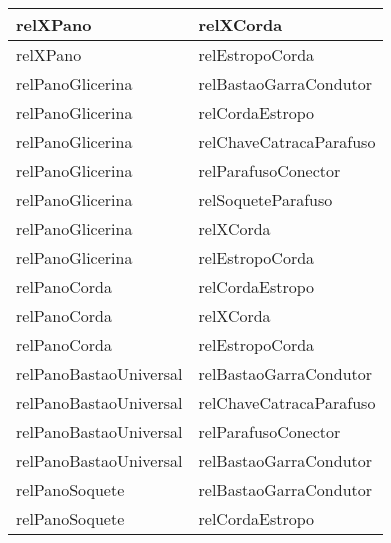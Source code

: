 \begin{center}
\begin{longtable}[H]{|l|l|}
relXPano                                        & relXCorda                                        \\ \hline
relXPano                                        & relEstropoCorda                                  \\ \hline
relPanoGlicerina                                & relBastaoGarraCondutor                           \\ \hline
relPanoGlicerina                                & relCordaEstropo                                  \\ \hline
relPanoGlicerina                                & relChaveCatracaParafuso                          \\ \hline
relPanoGlicerina                                & relParafusoConector                              \\ \hline
relPanoGlicerina                                & relSoqueteParafuso                               \\ \hline
relPanoGlicerina                                & relXCorda                                        \\ \hline
relPanoGlicerina                                & relEstropoCorda                                  \\ \hline
relPanoCorda                                    & relCordaEstropo                                  \\ \hline
relPanoCorda                                    & relXCorda                                        \\ \hline
relPanoCorda                                    & relEstropoCorda                                  \\ \hline
relPanoBastaoUniversal                          & relBastaoGarraCondutor                           \\ \hline
relPanoBastaoUniversal                          & relChaveCatracaParafuso                          \\ \hline
relPanoBastaoUniversal                          & relParafusoConector                              \\ \hline
relPanoBastaoUniversal                          & relBastaoGarraCondutor                           \\ \hline
relPanoSoquete                                  & relBastaoGarraCondutor                           \\ \hline
relPanoSoquete                                  & relCordaEstropo                                  \\ \hline

\end{longtable}
\end{center}
